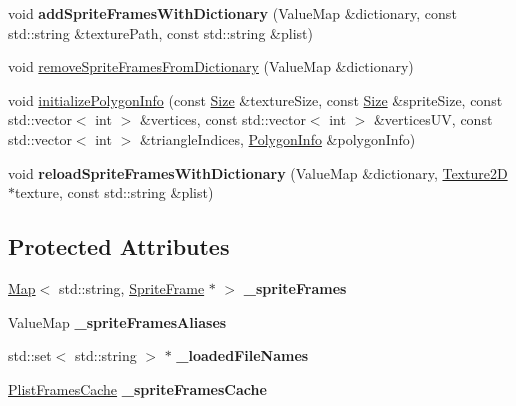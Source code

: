 \begin{DoxyCompactItemize}
void {\bfseries add\+Sprite\+Frames\+With\+Dictionary} (Value\+Map \&dictionary, const std\+::string \&texture\+Path, const std\+::string \&plist)
\item 
void \hyperlink{classSpriteFrameCache_ad9903fd9759969671fefe7721f3a7071}{remove\+Sprite\+Frames\+From\+Dictionary} (Value\+Map \&dictionary)
\item 
void \hyperlink{classSpriteFrameCache_a3b4d6f3e1281bc0251699b156cf0b680}{initialize\+Polygon\+Info} (const \hyperlink{classSize}{Size} \&texture\+Size, const \hyperlink{classSize}{Size} \&sprite\+Size, const std\+::vector$<$ int $>$ \&vertices, const std\+::vector$<$ int $>$ \&vertices\+UV, const std\+::vector$<$ int $>$ \&triangle\+Indices, \hyperlink{classPolygonInfo}{Polygon\+Info} \&polygon\+Info)
\item 
\mbox{\label{classSpriteFrameCache_abdf2570d6b486288f01f7fb795498654}} 
void {\bfseries reload\+Sprite\+Frames\+With\+Dictionary} (Value\+Map \&dictionary, \hyperlink{classTexture2D}{Texture2D} $\ast$texture, const std\+::string \&plist)
\end{DoxyCompactItemize}
\subsection*{Protected Attributes}
\begin{DoxyCompactItemize}
\item 
\mbox{\label{classSpriteFrameCache_a9718f1db25b5b41e8da13a8bea5aff2e}} 
\hyperlink{classMap}{Map}$<$ std\+::string, \hyperlink{classSpriteFrame}{Sprite\+Frame} $\ast$ $>$ {\bfseries \+\_\+sprite\+Frames}
\item 
\mbox{\label{classSpriteFrameCache_adb0faefe457676d617e5b86b14599600}} 
Value\+Map {\bfseries \+\_\+sprite\+Frames\+Aliases}
\item 
\mbox{\label{classSpriteFrameCache_a680a7932f24ffe7e657109ca5fb5808e}} 
std\+::set$<$ std\+::string $>$ $\ast$ {\bfseries \+\_\+loaded\+File\+Names}
\item 
\mbox{\label{classSpriteFrameCache_afb869ac8c5c8e0d9d68891553bfc60b7}} 
\hyperlink{classSpriteFrameCache_1_1PlistFramesCache}{Plist\+Frames\+Cache} {\bfseries \+\_\+sprite\+Frames\+Cache}
\end{DoxyCompactItemize}


